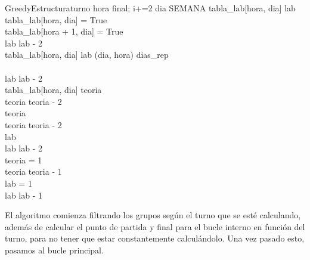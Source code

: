 \begin{pseudocode}{GreedyEstructura}{turno}
   		\FOR hora  \TO final; i+=2 \DO
   		\BEGIN
   		   \FOR dia \in SEMANA \DO
           \BEGIN
                \IF \NOT tabla\_lab[hora, dia] \AND lab  \THEN
                \BEGIN
                    \\
                    tabla\_lab[hora, dia] = True\\
                    tabla\_lab[hora + 1, dia] = True\\
                    lab \GETS lab - 2\\
                \END
                \ELSEIF tabla\_lab[hora, dia] \AND lab  \AND (dia, hora) \in dias\_rep \THEN
                \BEGIN
                    \\
                    \\
                    lab \GETS lab - 2\\
                \END
                \ELSEIF tabla\_lab[hora, dia] \AND teoria  \THEN
                \BEGIN
                    \\
                    teoria \GETS teoria - 2\\
                \END
                \ELSEIF teoria  \THEN
                \BEGIN
                    \\
                    teoria \GETS teoria - 2\\
                \END
                \ELSEIF lab  \THEN
                \BEGIN
                    \\
                    lab \GETS lab - 2\\
                \END
                \ELSEIF teoria = 1 \THEN
                \BEGIN
                  \\
                  teoria \GETS teoria - 1\\
                \END
                \ELSEIF lab = 1 \THEN
                \BEGIN
                  \\
                  lab \GETS lab - 1\\
                \END
                \ELSE {}
           \END
   		\END
   	\END
\END
\end{pseudocode}

El algoritmo comienza filtrando los grupos según el turno que se esté calculando, además de calcular el punto de partida y final para el bucle interno en función del turno, para no tener que estar constantemente calculándolo. Una vez pasado esto, pasamos al bucle principal.

